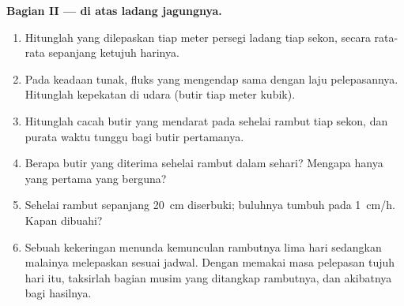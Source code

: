 \begin{problem}
\medskip
\noindent\textbf{Bagian II ---  di atas ladang jagungnya.}
\begin{enumerate}[resume]
  \item Hitunglah  yang dilepaskan tiap meter persegi ladang
        tiap sekon, secara rata-rata sepanjang ketujuh harinya.
  \item Pada keadaan tunak, fluks  yang mengendap sama
        dengan laju pelepasannya. Hitunglah kepekatan  di
        udara (butir tiap meter kubik).
  \item Hitunglah cacah butir yang mendarat pada sehelai rambut tiap
        sekon, dan purata waktu tunggu bagi butir pertamanya.
  \item Berapa butir yang diterima sehelai rambut dalam sehari? Mengapa
        hanya yang pertama yang berguna?
  \item Sehelai rambut sepanjang \qty{20}{cm} diserbuki; buluhnya
        tumbuh pada \qty{1}{cm/h}. Kapan  dibuahi?
  \item Sebuah kekeringan menunda kemunculan rambutnya lima hari
        sedangkan malainya melepaskan  sesuai jadwal. Dengan
        memakai masa pelepasan tujuh hari itu, taksirlah bagian musim
         yang ditangkap rambutnya, dan akibatnya bagi
        hasilnya.
\end{enumerate}


\end{problem}
